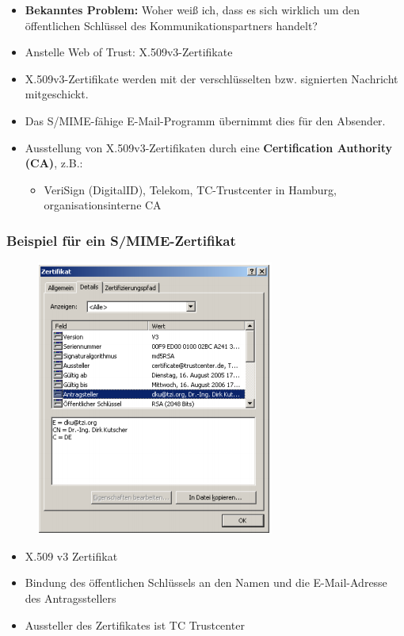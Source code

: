 \documentclass[openany]{book}
\begin{document}
\begin{itemize}
    \item \textbf{Bekanntes Problem:} Woher weiß ich, dass es sich wirklich um den öffentlichen Schlüssel des Kommunikationspartners handelt?
    \item Anstelle Web of Trust: X.509v3-Zertifikate
    \item X.509v3-Zertifikate werden mit der verschlüsselten bzw. signierten Nachricht mitgeschickt.
    \item Das S/MIME-fähige E-Mail-Programm übernimmt dies für den Absender.
    \item Ausstellung von X.509v3-Zertifikaten durch eine \textbf{Certification Authority (CA)}, z.B.:
    \begin{itemize}
        \item VeriSign (DigitalID), Telekom, TC-Trustcenter in Hamburg, organisationsinterne CA
    \end{itemize}
\end{itemize}

\newpage

\subsubsection{Beispiel für ein S/MIME-Zertifikat}

\begin{figure}[h!]
    \centering
    \includegraphics[width=0.65\linewidth]{Pics/SMIME.PNG}
\end{figure} 

\begin{itemize}
    \item X.509 v3 Zertifikat
    \item Bindung des öffentlichen Schlüssels an den Namen und die E-Mail-Adresse des Antragsstellers
    \item Aussteller des Zertifikates ist TC Trustcenter
\end{itemize}
\end{document}
